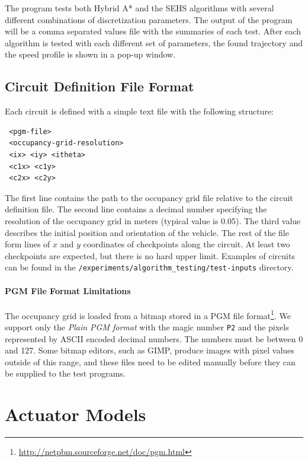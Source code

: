 The program tests both Hybrid A* and the \gls*{SEHS} algorithms with several different combinations of discretization parameters. The output of the program will be a comma separated values file with the summaries of each test. After each algorithm is tested with each different set of parameters, the found trajectory and the speed profile is shown in a pop-up window.

\subsection{Circuit Definition File Format}

Each circuit is defined with a simple text file with the following structure:

\begin{verbatim}
 <pgm-file>
 <occupancy-grid-resolution>
 <ix> <iy> <itheta>
 <c1x> <c1y>
 <c2x> <c2y>
\end{verbatim}

The first line contains the path to the occupancy grid file relative to the circuit definition file. The second line contains a decimal number specifying the resolution of the occupancy grid in meters (typical value is \num{0.05}). The third value describes the initial position and orientation of the vehicle. The rest of the file form lines of $x$ and $y$ coordinates of checkpoints along the circuit. At least two checkpoints are expected, but there is no hard upper limit. Examples of circuits can be found in the \texttt{/experiments/\-algorithm\-\_testing/\-test-inputs} directory.

\paragraph{PGM File Format Limitations}

The occupancy grid is loaded from a bitmap stored in a PGM file format\footnote{\url{http://netpbm.sourceforge.net/doc/pgm.html}}. We support only the \textit{Plain PGM format} with the magic number \texttt{P2} and the pixels represented by ASCII encoded decimal numbers. The numbers must be between \num{0} and \num{127}. Some bitmap editors, such as GIMP, produce images with pixel values outside of this range, and these files need to be edited manually before they can be supplied to the test programs.

\section{Actuator Models}

